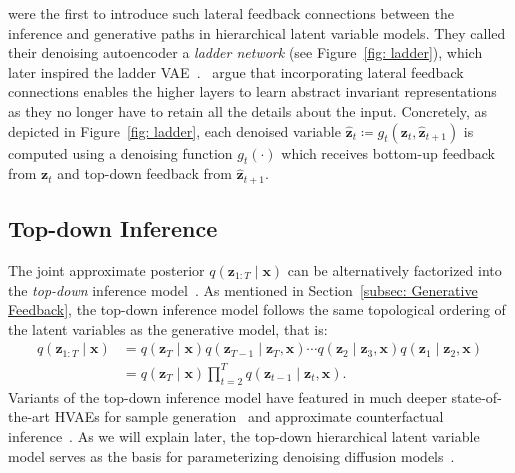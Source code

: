 \cite{valpola2015neural,rasmus2015semi} were the first to introduce such lateral feedback connections between the inference and generative paths in hierarchical latent variable models. They called their denoising autoencoder a \textit{ladder network} (see Figure~\ref{fig: ladder}), which later inspired the ladder VAE~\citep{sonderby2016ladder}.~\cite{valpola2015neural} argue that incorporating lateral feedback connections enables the higher layers to learn abstract invariant representations as they no longer have to retain all the details about the input. Concretely, as depicted in Figure~\ref{fig: ladder}, each denoised variable $\hat{\mathbf{z}}_t \coloneqq g_t(\mathbf{z}_t, \hat{\mathbf{z}}_{t+1})$ is computed using a denoising function $g_t(\cdot)$ which receives bottom-up feedback from $\mathbf{z}_t$ and top-down feedback from $\hat{\mathbf{z}}_{t+1}$.
%
\subsection{Top-down Inference}
\label{subsec: Top-down Inference Model}
%
The joint approximate posterior $q(\mathbf{z}_{1:T} \mid \mathbf{x})$ can be alternatively factorized into the \textit{top-down} inference model~\citep{sonderby2016ladder,kingma2016improved}. As mentioned in Section~\ref{subsec: Generative Feedback}, the top-down inference model follows the same topological ordering of the latent variables as the generative model, that is:
%
\begin{align}
    q(\mathbf{z}_{1:T} \mid \mathbf{x}) & = q(\mathbf{z}_T \mid \mathbf{x}) q(\mathbf{z}_{T-1} \mid \mathbf{z}_{T}, \mathbf{x}) \cdots q(\mathbf{z}_2 \mid \mathbf{z}_3, \mathbf{x})q(\mathbf{z}_1 \mid \mathbf{z}_2, \mathbf{x})
    \\[5pt] & 
    = q(\mathbf{z}_T \mid \mathbf{x}) \prod_{t=2}^{T} q(\mathbf{z}_{t-1} \mid \mathbf{z}_t, \mathbf{x}).
\end{align}
%
Variants of the top-down inference model have featured in much deeper state-of-the-art HVAEs for sample generation~\citep{maaloe2019biva,vahdat2020nvae,child2020very,shu2022bit} and approximate counterfactual inference~\citep{pmlr-v202-de-sousa-ribeiro23a,monteiro2022measuring}. As we will explain later, the top-down hierarchical latent variable model serves as the basis for parameterizing denoising diffusion models~\citep{sohl2015deep,ho2020denoising,kingma2021variational}. 

